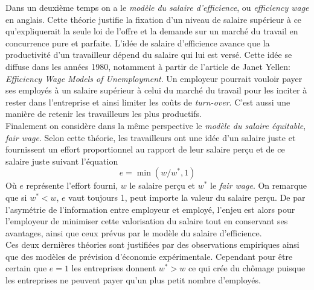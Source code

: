 \documentclass[main.tex]{subfiles}
\begin{document}
        Dans un deuxième temps on a le \emph{modèle du salaire d'efficience}, ou \emph{efficiency wage} en anglais. Cette théorie justifie la fixation d'un niveau de salaire supérieur à ce qu'expliquerait la seule loi de l'offre et la demande sur un marché du travail en concurrence pure et parfaite. L'idée de salaire d'efficience avance que la productivité d'un travailleur dépend du salaire qui lui est versé. Cette idée se diffuse dans les années 1980, notamment à partir de l'article de Janet Yellen: \textit{Efficiency Wage Models of Unemployment}. Un employeur pourrait vouloir payer ses employés à un salaire supérieur à celui du marché du travail pour les inciter à rester dans l'entreprise et ainsi limiter les coûts de \emph{turn-over}. C'est aussi une manière de retenir les travailleurs les plus productifs. \\
        Finalement on considère dans la même perspective le \emph{modèle du salaire équitable}, \emph{fair wage}. Selon cette théorie, les travailleurs ont une idée d'un salaire juste et fournissent un effort proportionnel au rapport de leur salaire perçu et de ce salaire juste suivant l'équation
        \begin{equation}
                e = \min(w/w^{*}, 1) 
        \end{equation}
        Où $e$ représente l'effort fourni, $w$ le salaire perçu et $w^{*}$ le \emph{fair wage}. On remarque que si $w^{*} < w$, $e$ vaut toujours 1, peut importe la valeur du salaire perçu. De par l'asymétrie de l'information entre employeur et employé, l'enjeu est alors pour l'employeur de minimiser cette valorisation du salaire tout en conservant ses avantages, ainsi que ceux prévus par le modèle du salaire d'efficience. \\
        Ces deux dernières théories sont justifiées par des observations empiriques ainsi que des modèles de prévision d'économie expérimentale. Cependant pour être certain que $e = 1$ les entreprises donnent $w^{*} > w$ ce qui crée du chômage puisque les entreprises ne peuvent payer qu'un plus petit nombre d'employés. 
\end{document}

